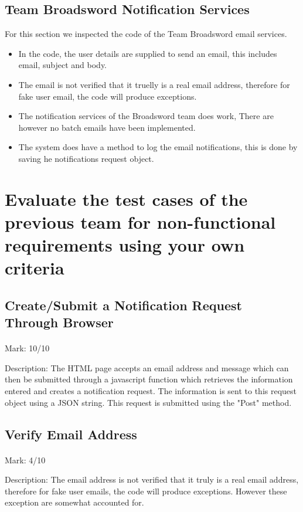\documentclass[11pt]{article}
\begin{document}
	\subsection{Team Broadsword Notification Services}
	For this section we inspected the code of the Team Broadsword email services.
	\begin{itemize}
		\item In the code, the user details are supplied to send an email, this includes email, subject and body. 
		\item The email is not verified that it truelly is a real email address, therefore for fake user email, the code will produce exceptions. 
		\item The notification services of the Broadsword team does work, There are however no batch emails have been implemented.
		\item The system does have a method to log the email notifications, this is done by saving he notifications request object.  
	\end{itemize}
	
\section{Evaluate the test cases of the previous team for non-functional requirements using your own criteria}	

	\subsection{Create/Submit a Notification Request Through Browser} 
		\paragraph{} Mark: 10/10
		\noindent
		\begin{center}
			Description: The HTML page accepts an email address and message which can then be submitted through a javascript function which retrieves the information entered and creates a notification request. The information is sent to this request object using a JSON string. This request is submitted using the "Post" method.
		\end{center}

	\subsection{Verify Email Address} 
		\paragraph{} Mark: 4/10
		\noindent
		\begin{center}
			Description: The email address is not verified that it truly is a real email address, therefore for fake user emails, the code will produce exceptions. However these exception are somewhat accounted for.
		\end{center}
\end{document}
